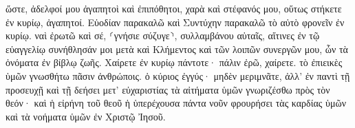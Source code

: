 \documentclass{openreader}
\begin{document}
ὥστε, ἀδελφοί μου ἀγαπητοὶ καὶ ἐπιπόθητοι, χαρὰ καὶ στέφανός μου, οὕτως στήκετε ἐν κυρίῳ, ἀγαπητοί. 
Εὐοδίαν παρακαλῶ καὶ Συντύχην παρακαλῶ τὸ αὐτὸ φρονεῖν ἐν κυρίῳ. 
ναὶ ἐρωτῶ καὶ σέ, ⸂γνήσιε σύζυγε⸃, συλλαμβάνου αὐταῖς, αἵτινες ἐν τῷ εὐαγγελίῳ συνήθλησάν μοι μετὰ καὶ Κλήμεντος καὶ τῶν λοιπῶν συνεργῶν μου, ὧν τὰ ὀνόματα ἐν βίβλῳ ζωῆς. 
Χαίρετε ἐν κυρίῳ πάντοτε· πάλιν ἐρῶ, χαίρετε. 
τὸ ἐπιεικὲς ὑμῶν γνωσθήτω πᾶσιν ἀνθρώποις. ὁ κύριος ἐγγύς· 
μηδὲν μεριμνᾶτε, ἀλλ’ ἐν παντὶ τῇ προσευχῇ καὶ τῇ δεήσει μετ’ εὐχαριστίας τὰ αἰτήματα ὑμῶν γνωριζέσθω πρὸς τὸν θεόν· 
καὶ ἡ εἰρήνη τοῦ θεοῦ ἡ ὑπερέχουσα πάντα νοῦν φρουρήσει τὰς καρδίας ὑμῶν καὶ τὰ νοήματα ὑμῶν ἐν Χριστῷ Ἰησοῦ. 
\end{document}
